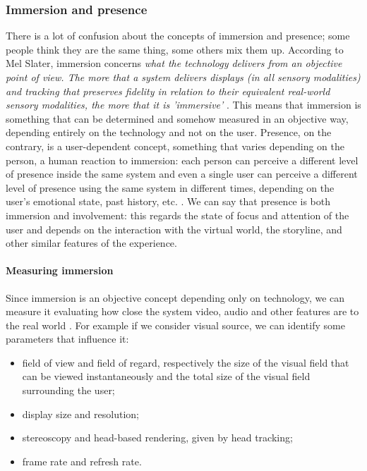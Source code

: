 \documentclass[binding=0.6cm,LaM]{sapthesis}
\begin{document}
\subsubsection{Immersion and presence}
There is a lot of confusion about the concepts of immersion and presence; some people think they are the same thing, some others mix them up. According to Mel Slater, immersion concerns \textit{what the technology delivers from an objective point of view. The more that a system delivers displays (in all sensory modalities) and tracking that preserves fidelity in relation to their equivalent real-world sensory modalities, the more that it is 'immersive'} \cite{slater2003note}. 
This means that immersion is something that can be determined and somehow measured in an objective way, depending entirely on the technology and not on the user. 
Presence, on the contrary, is a user-dependent concept, something that varies depending on the person, a human reaction to immersion: each person can perceive a different level of presence inside the same system and even a single user can perceive a different level of presence using the same system in different times, depending on the user's emotional state, past history, etc. \cite{bowman2007virtual}.
We can say that presence is both immersion and involvement: this regards the state of focus and attention of the user and depends on the interaction with the virtual world, the storyline, and other similar features of the experience.

\paragraph{Measuring immersion}
Since immersion is an objective concept depending only on technology, we can measure it evaluating how close the system video, audio and other features are to the real world \cite{bowman2007virtual}. For example if we consider visual source, we can identify some parameters that influence it: 
\begin{itemize}
\item field of view and field of regard, respectively the size of the visual field that can be viewed instantaneously and the total size of the visual field surrounding the user;
\item display size and resolution;
\item stereoscopy and head-based rendering, given by head tracking;
\item frame rate and refresh rate.
\end{itemize}
\end{document}
